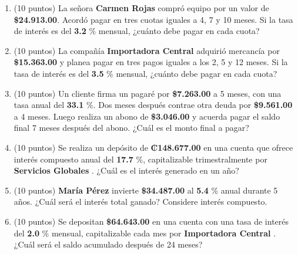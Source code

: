 \documentclass[10pt]{article}
\begin{document}
\begin{enumerate}[leftmargin=*, label=\textbf{\arabic*.}]
  \item (10 puntos) La señora \textbf{ Carmen Rojas } compró equipo por un valor de \textbf{\$\num{ 24,913.00 }}. Acordó pagar en tres cuotas iguales a 4, 7 y 10 meses. Si la tasa de interés es del \textbf{ 3.2 }\% mensual, ¿cuánto debe pagar en cada cuota?

  \vspace{0.5cm}

  \item (10 puntos) La compañía \textbf{ Importadora Central } adquirió mercancía por \textbf{\$\num{ 15,363.00 }} y planea pagar en tres pagos iguales a los 2, 5 y 12 meses. Si la tasa de interés es del \textbf{ 3.5 }\% mensual, ¿cuánto debe pagar en cada cuota?

  \vspace{0.5cm}

  \item (10 puntos) Un cliente firma un pagaré por \textbf{\$\num{ 7,263.00 }} a 5 meses, con una tasa anual del \textbf{ 33.1 }\%. Dos meses después contrae otra deuda por \textbf{\$\num{ 9,561.00 }} a 4 meses. Luego realiza un abono de \textbf{\$\num{ 3,046.00 }} y acuerda pagar el saldo final 7 meses después del abono. ¿Cuál es el monto final a pagar?

  \vspace{0.5cm}

  \item (10 puntos) Se realiza un depósito de \textbf{₡\num{ 148.677.00 }} en una cuenta que ofrece interés compuesto anual del \textbf{ 17.7 }\%, capitalizable trimestralmente por \textbf{ Servicios Globales }. ¿Cuál es el interés generado en un año?

  \vspace{0.5cm}

  \item (10 puntos) \textbf{ María Pérez } invierte \textbf{\$\num{ 34,487.00 }} al \textbf{ 5.4 }\% anual durante 5 años. ¿Cuál será el interés total ganado? Considere interés compuesto.

  \vspace{0.5cm}

  \item (10 puntos) Se depositan \textbf{\$\num{ 64,643.00 }} en una cuenta con una tasa de interés del \textbf{ 2.0 }\% mensual, capitalizable cada mes por \textbf{ Importadora Central }. ¿Cuál será el saldo acumulado después de 24 meses?
\end{enumerate}



\newpage
\end{document}
